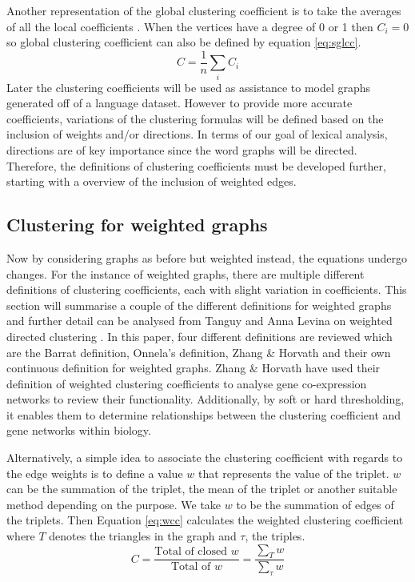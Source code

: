Another representation of the global clustering coefficient is to take the averages of all the local coefficients \cite{https://doi.org/10.48550/arxiv.1410.1997}. When the vertices have a degree of 0 or 1 then $C_i = 0$ so global clustering coefficient can also be defined by equation \ref{eq:sglcc}.
\begin{equation} \label{eq:sglcc}
C = \frac{1}{n}\sum_i{C_i}
\end{equation}
Later the clustering coefficients will be used as assistance to model graphs generated off of a language dataset. However to provide more accurate coefficients, variations of the clustering formulas will be defined based on the inclusion of weights and/or directions. In terms of our goal of lexical analysis, directions are of key importance since the word graphs will be directed. Therefore, the definitions of clustering coefficients must be developed further, starting with a overview of the inclusion of weighted edges.

\subsection{Clustering for weighted graphs}
Now by considering graphs as before but weighted instead, the equations undergo changes. For the instance of weighted graphs, there are multiple different definitions of clustering coefficients, each with slight variation in coefficients. This section will summarise a couple of the different definitions for weighted graphs and further detail can be analysed from Tanguy and Anna Levina on weighted directed clustering \cite{PhysRevResearch.3.043124}. In this paper, four different definitions are reviewed which are the Barrat definition, Onnela's definition, Zhang \& Horvath and their own continuous definition for weighted graphs. Zhang \& Horvath \cite{ZhangHorvath+2005} have used their definition of weighted clustering coefficients to analyse gene co-expression networks to review their functionality. Additionally, by soft or hard thresholding, it enables them to determine relationships between the clustering coefficient and gene networks within biology.

Alternatively, a simple idea to associate the clustering coefficient with regards to the edge weights is to define a value $w$ that represents the value of the triplet. $w$ can be the summation of the triplet, the mean of the triplet or another suitable method depending on the purpose. We take $w$ to be the summation of edges of the triplets. Then Equation \ref{eq:wcc} calculates the weighted clustering coefficient \cite{opsahl2009clustering} where $T$ denotes the triangles in the graph and $\tau$, the triples.
\begin{equation} \label{eq:wcc}
C = \frac{\text{Total of closed }w}{\text{Total of }w} = \frac{\sum_T{w}}{\sum_\tau{w}}
\end{equation}

